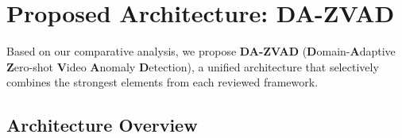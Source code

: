 
\section{Proposed Architecture: DA-ZVAD}
\label{sec:proposed}

Based on our comparative analysis, we propose \textbf{DA-ZVAD} (\textbf{D}omain-\textbf{A}daptive \textbf{Z}ero-shot \textbf{V}ideo \textbf{A}nomaly \textbf{D}etection), a unified architecture that selectively combines the strongest elements from each reviewed framework.

\subsection{Architecture Overview}

